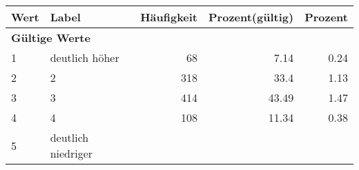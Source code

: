      \begin{longtable}{lXrrr}
     \toprule
     \textbf{Wert} & \textbf{Label} & \textbf{Häufigkeit} & \textbf{Prozent(gültig)} & \textbf{Prozent} \\
     \endhead
     \midrule
     \multicolumn{5}{l}{\textbf{Gültige Werte}}\\

     1 &
     \multicolumn{1}{X}{ deutlich höher   } &


       \num{68} &
       \num[round-mode=places,round-precision=2]{7,14} &
         \num[round-mode=places,round-precision=2]{0,24} \\

     2 &
     \multicolumn{1}{X}{ 2   } &


       \num{318} &
       \num[round-mode=places,round-precision=2]{33,4} &
         \num[round-mode=places,round-precision=2]{1,13} \\

     3 &
     \multicolumn{1}{X}{ 3   } &


       \num{414} &
       \num[round-mode=places,round-precision=2]{43,49} &
         \num[round-mode=places,round-precision=2]{1,47} \\

     4 &
     \multicolumn{1}{X}{ 4   } &


       \num{108} &
       \num[round-mode=places,round-precision=2]{11,34} &
         \num[round-mode=places,round-precision=2]{0,38} \\

     5 &
     \multicolumn{1}{X}{ deutlich niedriger   } &



\end{longtable}
